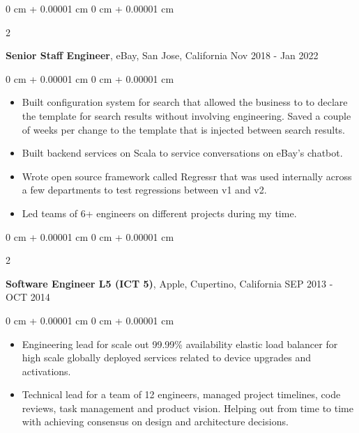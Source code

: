 \documentclass[10pt, letterpaper]{article}
\newenvironment{highlights}{
    \begin{itemize}[
        topsep=0.10 cm,
        parsep=0.10 cm,
        partopsep=0pt,
        itemsep=0pt,
        leftmargin=0 cm + 10pt
    ]
}{
    \end{itemize}
} %
\newenvironment{onecolentry}{
    \begin{adjustwidth}{
        0 cm + 0.00001 cm
    }{
        0 cm + 0.00001 cm
    }
}{
    \end{adjustwidth}
} %
\newenvironment{twocolentry}[2][]{
    \onecolentry
    \def\secondColumn{#2}
    \setcolumnwidth{\fill, 4.5 cm}
    \begin{paracol}{2}
}{
    \switchcolumn \raggedleft \secondColumn
    \end{paracol}
    \endonecolentry
} %
\begin{document}
        \vspace{0.15 cm}
        \begin{twocolentry}{
            Nov 2018 - Jan 2022
        }
            \textbf{Senior Staff Engineer}, eBay, San Jose, California\end{twocolentry}
        \vspace{0.10 cm}
        \begin{onecolentry}
            \begin{highlights}
                \item Built configuration system for search that allowed the business to to declare the template for search results without involving engineering. Saved a couple of weeks per change to the template that is injected between search results.
                \item Built backend services on Scala to service conversations on eBay's chatbot.
                \item Wrote open source framework called Regressr that was used internally across a few departments to test regressions between v1 and v2.
                \item Led teams of 6+ engineers on different projects during my time.
            \end{highlights}
        \end{onecolentry}

        \vspace{0.15 cm}
        \begin{twocolentry}{
            SEP 2013 - OCT 2014
        }
            \textbf{Software Engineer L5 (ICT 5)}, Apple, Cupertino, California\end{twocolentry}
        \vspace{0.10 cm}
        \begin{onecolentry}
            \begin{highlights}
                \item Engineering lead for scale out 99.99\% availability elastic load balancer for high scale globally deployed services related to device upgrades and activations.
                \item Technical lead for a team of 12 engineers, managed project timelines, code reviews, task management and product vision. Helping out from time to time with achieving consensus on design and architecture decisions.
            \end{highlights}
        \end{onecolentry}
\end{document}
